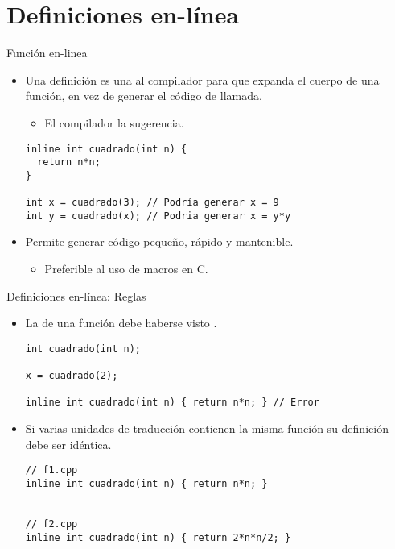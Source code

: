 \section{Definiciones en-línea}

\begin{frame}[t,fragile]{Función en-linea}
\begin{itemize}
  \item Una definición  es una  
        al compilador para que expanda
        el cuerpo de una función, en vez de generar el código de llamada.
    \begin{itemize}
      \item El compilador  la sugerencia.
    \end{itemize}
\begin{lstlisting}
inline int cuadrado(int n) { 
  return n*n; 
}

int x = cuadrado(3); // Podría generar x = 9
int y = cuadrado(x); // Podria generar x = y*y
\end{lstlisting}

  \item Permite generar código pequeño, rápido y mantenible.
    \begin{itemize}
      \item Preferible al uso de macros en C.
    \end{itemize}
\end{itemize}
\end{frame}

\begin{frame}[t,fragile]{Definiciones en-línea: Reglas}
\begin{itemize}
\item La  de una función  
      debe haberse visto .

\begin{lstlisting}
int cuadrado(int n);

x = cuadrado(2);

inline int cuadrado(int n) { return n*n; } // Error
\end{lstlisting}

\item Si varias unidades de traducción contienen la misma función 
      su definición debe ser idéntica.

\begin{lstlisting}
// f1.cpp
inline int cuadrado(int n) { return n*n; }


// f2.cpp
inline int cuadrado(int n) { return 2*n*n/2; }
\end{lstlisting}
\end{itemize}

\end{frame}


